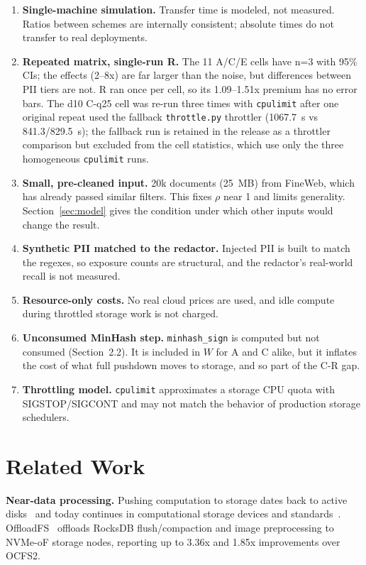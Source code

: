 \documentclass[11pt]{article}
\begin{document}
\begin{enumerate}
\item \textbf{Single-machine simulation.} Transfer time is modeled, not measured. Ratios between schemes are internally consistent; absolute times do not transfer to real deployments.
\item \textbf{Repeated matrix, single-run R.} The 11 A/C/E cells have n=3 with 95\% CIs; the effects (2--8x) are far larger than the noise, but differences between PII tiers are not. R ran once per cell, so its 1.09--1.51x premium has no error bars. The d10 C-q25 cell was re-run three times with \texttt{cpulimit} after one original repeat used the fallback \texttt{throttle.py} throttler (1067.7~s vs 841.3/829.5~s); the fallback run is retained in the release as a throttler comparison but excluded from the cell statistics, which use only the three homogeneous \texttt{cpulimit} runs.
\item \textbf{Small, pre-cleaned input.} 20k documents (25~MB) from FineWeb, which has already passed similar filters. This fixes $\rho$ near 1 and limits generality. Section~\ref{sec:model} gives the condition under which other inputs would change the result.
\item \textbf{Synthetic PII matched to the redactor.} Injected PII is built to match the regexes, so exposure counts are structural, and the redactor's real-world recall is not measured.
\item \textbf{Resource-only costs.} No real cloud prices are used, and idle compute during throttled storage work is not charged.
\item \textbf{Unconsumed MinHash step.} \texttt{minhash\_sign} is computed but not consumed (Section~2.2). It is included in $W$ for A and C alike, but it inflates the cost of what full pushdown moves to storage, and so part of the C-R gap.
\item \textbf{Throttling model.} \texttt{cpulimit} approximates a storage CPU quota with SIGSTOP/SIGCONT and may not match the behavior of production storage schedulers.
\end{enumerate}

\section{Related Work}

\textbf{Near-data processing.} Pushing computation to storage dates back to active disks~\cite{acharya1998activedisks,riedel1998activestorage} and today continues in computational storage devices and standards~\cite{snia2022cs}. OffloadFS~\cite{moon2026offloadfs} offloads RocksDB flush/compaction and image preprocessing to NVMe-oF storage nodes, reporting up to 3.36x and 1.85x improvements over OCFS2.
\end{document}
